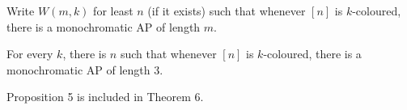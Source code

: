 \documentclass{article}
\begin{document}
\newlec
Write $W(m,k)$ for least $n$ (if it exists) such that whenever $[n]$ is $k$-coloured, there is a monochromatic AP of length $m$.
\begin{nprop}%
  For every $k$, there is $n$ such that whenever $[n]$ is $k$-coloured, there is a monochromatic AP of length $3$.
\end{nprop}
\begin{remark}
  Proposition 5 is included in Theorem 6.
\end{remark}
\begin{center}
\end{center}
\end{document}
